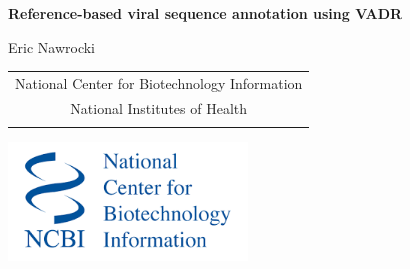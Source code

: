 \documentclass[landscape]{slides}
\begin{document}
\begin{slide}
\begin{center}
\large{\textbf{Reference-based viral sequence annotation using VADR}}

\normalsize

Eric Nawrocki \\

\medskip

\medskip

\medskip

\medskip

\medskip

\small
\begin{tabular}{c}
National Center for Biotechnology Information\\
National Institutes of Health\\
\\
\end{tabular}

\vspace{0.1in}

\includegraphics[width=2.5in]{figs/ncbi-logo}

\end{center}
\end{slide}
\end{document}
